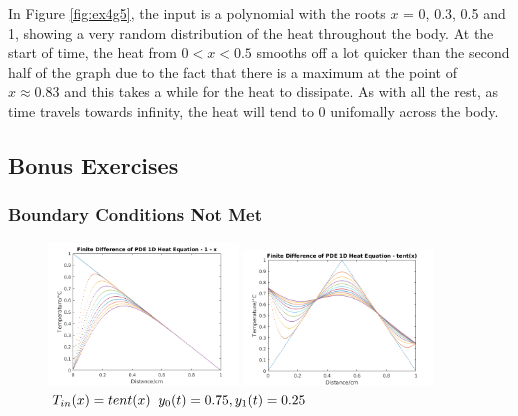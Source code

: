 \documentclass[11pt,a4paper]{article}
\begin{document}
\vspace{4mm}In Figure \ref{fig:ex4g5}, the input is a polynomial with the roots $x$ = 0, 0.3, 0.5 and 1, showing a very random distribution of the heat throughout the body. At the start of time, the heat from $0 < x < 0.5$ smooths off a lot quicker than  the second half of the graph due to the fact that there is a maximum at the point of $x \approx 0.83$ and this takes a while for the heat to dissipate. As with all the rest, as time travels towards infinity, the heat will tend to 0 unifomally across the body.

\vspace{40mm}
\subsection{Bonus Exercises}
\subsubsection{Boundary Conditions Not Met}

\begin{figure}
	\vspace{-10mm}
	\includegraphics[width=0.45\textwidth]{Ex4_Figs/1-xbcdiff.png}
	\vspace{-3mm}
	\caption{$T_{in}(x)= 1-x$}
	\label{fig:ex4g6}
		\includegraphics[width=0.45\textwidth]{Ex4_Figs/Tentbc.png}
		\vspace{-3mm}
	\caption{$T_{in}(x)= tent(x) \hspace{2mm} y_0(t) = 0.75, y_1(t) = 0.25$}
	\label{fig:ex4g7}
\end{figure}
\end{document}
